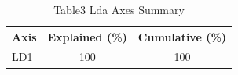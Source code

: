 
\begin{table}[htbp]
    \centering
    \small
    \caption{Table3 Lda Axes Summary}
    \label{tab:table3_lda_axes_summary}
    \begin{tabular}{lcc}
        \toprule
        Axis & Explained (\%) & Cumulative (\%) \\
        \midrule
        LD1 & 100 & 100 \\
        \bottomrule
    \end{tabular}
\end{table}
